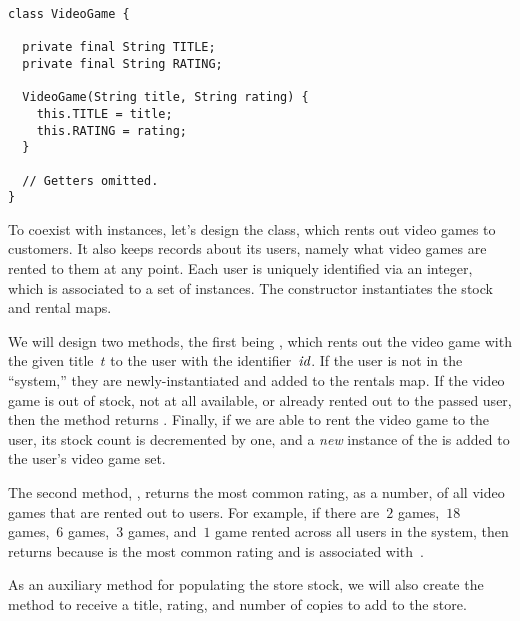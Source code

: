 \begin{lstlisting}[language=MyJava]
class VideoGame {

  private final String TITLE;
  private final String RATING;

  VideoGame(String title, String rating) {
    this.TITLE = title;
    this.RATING = rating;
  }

  // Getters omitted.
}
\end{lstlisting}

To coexist with  instances, let's design the  class, which rents out video games to customers.
It also keeps records about its users, namely what video games are rented to them at any point.
Each user is uniquely identified via an integer, which is associated to a set of  instances. The constructor instantiates the stock and rental maps.

We will design two methods, the first being , which rents out the video game with the given title~$t$ to the user with the identifier~$\emph{id}$.
If the user is not in the ``system,'' they are newly-instantiated and added to the rentals map.
If the video game is out of stock, not at all available, or already rented out to the passed user, then the method returns .
Finally, if we are able to rent the video game to the user, its stock count is decremented by one, and a \emph{new} instance of the  is added to the user's video game set.

The second method, , returns the most common rating, as a number, of all video games that are rented out to users.
For example, if there are~$2$  games,~$18$  games,~$6$  games,~$3$  games, and~$1$  game rented across all users in the system, then  returns  because  is the most common rating and is associated with~.

As an auxiliary method for populating the store stock, we will also create the  method to receive a title, rating, and number of copies to add to the store.

